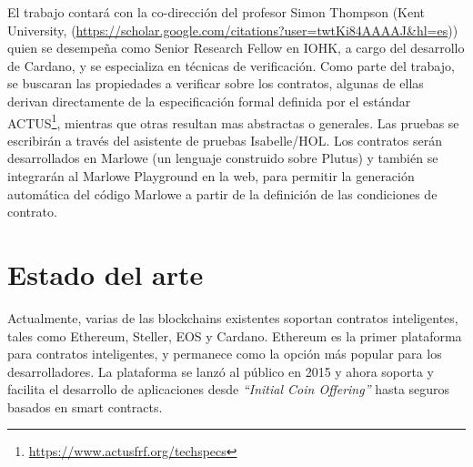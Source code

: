 \documentclass[12pt]{book}
\begin{document}
El trabajo contará con la co-dirección del profesor Simon Thompson (Kent University, (\url{https://scholar.google.com/citations?user=twtKi84AAAAJ&hl=es})) quien se desempeña como Senior Research Fellow en IOHK, a cargo del desarrollo de Cardano, y se especializa en técnicas de verificación. Como parte del trabajo, se buscaran las propiedades a verificar sobre los contratos, algunas de ellas derivan directamente de la especificación formal definida por el estándar ACTUS\footnote{\href{https://www.actusfrf.org/techspecs}{https://www.actusfrf.org/techspecs}}, mientras que otras resultan mas abstractas o generales. Las pruebas se escribirán a través del asistente de pruebas Isabelle/HOL. Los contratos serán desarrollados en Marlowe (un lenguaje construido sobre Plutus) y también se integrarán al Marlowe Playground en la web, para permitir la generación automática del código Marlowe a partir de la definición de las condiciones de contrato. %







\section{Estado del arte}

Actualmente, varias de las blockchains existentes soportan contratos inteligentes, tales como Ethereum, Steller, EOS y Cardano. Ethereum es la primer plataforma para contratos inteligentes, y permanece como la opción más popular para los desarrolladores. La plataforma se lanzó al público en 2015 y ahora soporta y facilita el desarrollo de aplicaciones desde \textit{``Initial Coin Offering''} hasta seguros basados en smart contracts.
\end{document}
